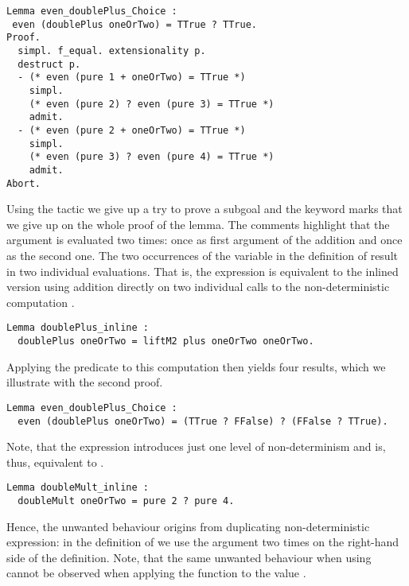 \begin{verbatim}
Lemma even_doublePlus_Choice :
 even (doublePlus oneOrTwo) = TTrue ? TTrue.
Proof.
  simpl. f_equal. extensionality p.
  destruct p.
  - (* even (pure 1 + oneOrTwo) = TTrue *)
    simpl.
    (* even (pure 2) ? even (pure 3) = TTrue *)
    admit.
  - (* even (pure 2 + oneOrTwo) = TTrue *)
    simpl.
    (* even (pure 3) ? even (pure 4) = TTrue *)
    admit.
Abort.
\end{verbatim}

Using the tactic  we give up a try to prove a subgoal and the keyword  marks that we give up on the whole proof of the lemma.
The comments highlight that the argument  is evaluated two times: once as first argument of the addition and once as the second one.
The two occurrences of the variable  in the definition of  result in two individual evaluations.
That is, the expression is equivalent to the inlined version using addition directly on two individual calls to the non\--deterministic computation .

\begin{verbatim}
Lemma doublePlus_inline :
  doublePlus oneOrTwo = liftM2 plus oneOrTwo oneOrTwo.
\end{verbatim}

\noindent Applying the predicate  to this computation then yields four results, which we illustrate with the second proof.

\begin{verbatim}
Lemma even_doublePlus_Choice :
  even (doublePlus oneOrTwo) = (TTrue ? FFalse) ? (FFalse ? TTrue).
\end{verbatim}

Note, that the expression  introduces just one level of non\--determinism and is, thus, equivalent to .

\begin{verbatim}
Lemma doubleMult_inline :
  doubleMult oneOrTwo = pure 2 ? pure 4.
\end{verbatim}

Hence, the unwanted behaviour origins from duplicating non\--deterministic expression: in the definition of  we use the argument  two times on the right\--hand side of the definition.
Note, that the same unwanted behaviour when using  cannot be observed when applying the function to the value .

